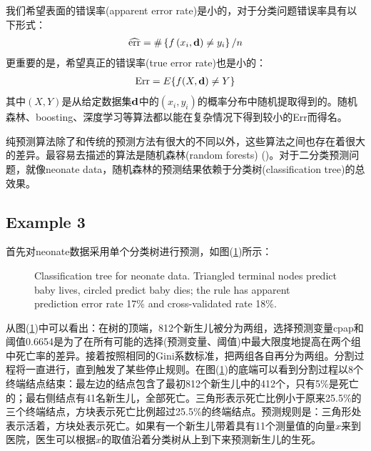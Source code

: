 \documentclass[lang=cn,11pt,a4paper,cite=authoryear]{elegantpaper}
\begin{document}
我们希望表面的错误率(apparent error rate)是小的，对于分类问题错误率具有以下形式：
\begin{align}
\widehat{\text{err}}=\#\left\{f\left(x_{i}, \bold{d}\right) \neq y_{i}\right\} / n
\end{align}
更重要的是，希望真正的错误率(true error rate)也是小的：
\begin{align}
\text{Err}=E\{f(X, \bold{d}) \neq Y\}
\end{align}
其中$(X, Y)$是从给定数据集$\bold{d}$中的$(x_i, y_i)$的概率分布中随机提取得到的。随机森林、boosting、深度学习等算法都以能在复杂情况下得到较小的Err而得名。

纯预测算法除了和传统的预测方法有很大的不同以外，这些算法之间也存在着很大的差异。最容易去描述的算法是随机森林(random forests) (\cite{breiman2001statistical})。对于二分类预测问题，就像neonate data，随机森林的预测结果依赖于分类树(classification tree)的总效果。

\subsection{Example 3}

首先对neonate数据采用单个分类树进行预测，如图(\ref{fig3})所示：
\begin{figure}[H]
		\centering
		\caption{Classification tree for neonate data. Triangled terminal nodes predict baby lives, circled predict baby dies; the rule has apparent prediction error rate 17\% and cross-validated rate 18\%.}
		\label{fig3}
\end{figure}


从图(\ref{fig3})中可以看出：在树的顶端，812个新生儿被分为两组，选择预测变量cpap和阈值0.6654是为了在所有可能的选择(预测变量、阈值)中最大限度地提高在两个组中死亡率的差异。接着按照相同的Gini系数标准，把两组各自再分为两组。分割过程将一直进行，直到触发了某些停止规则。在图(\ref{fig3})的底端可以看到分割过程以8个终端结点结束：最左边的结点包含了最初812个新生儿中的412个，只有5\%是死亡的；最右侧结点有41名新生儿，全部死亡。三角形表示死亡比例小于原来25.5\%的三个终端结点，方块表示死亡比例超过25.5\%的终端结点。预测规则是：三角形处表示活着，方块处表示死亡。如果有一个新生儿带着具有11个测量值的向量$x$来到医院，医生可以根据$x$的取值沿着分类树从上到下来预测新生儿的生死。
\end{document}
